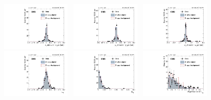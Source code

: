 		\begin{figure}[p]
		  \centering
		  \includegraphics[width=0.31\textwidth]{Fig/Final_NoPreliminary/ZJpsiG/VtxDispX_Norm_EBHR9}~
		  \includegraphics[width=0.31\textwidth]{Fig/Final_NoPreliminary/ZJpsiG/VtxDispY_Norm_EBHR9}~
		  \includegraphics[width=0.31\textwidth]{Fig/Final_NoPreliminary/ZJpsiG/VtxDispZ_Norm_EBHR9}\\
		  \includegraphics[width=0.31\textwidth]{Fig/Final_NoPreliminary/ZJpsiG/Lxy_Norm_EBHR9}~
		  \includegraphics[width=0.31\textwidth]{Fig/Final_NoPreliminary/ZJpsiG/Rxy_Norm_EBHR9}~
		  \includegraphics[width=0.31\textwidth]{Fig/Final_NoPreliminary/ZJpsiG/SLxy_Norm_EBHR9}\\

\end{figure}
